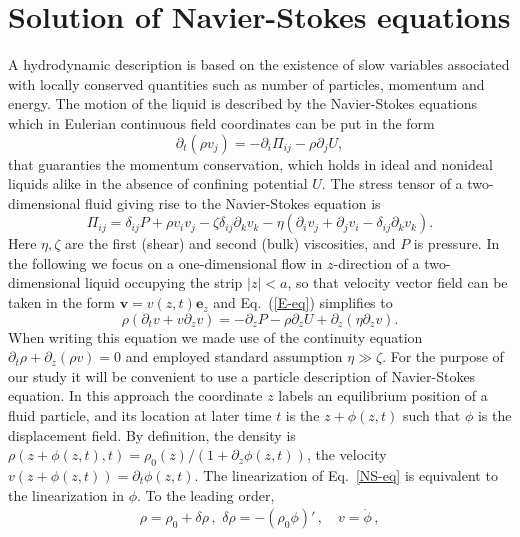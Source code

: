 \section{Solution of Navier-Stokes equations}
A hydrodynamic description is based on the existence of slow variables associated with locally conserved quantities such as number of particles, momentum and energy. The motion of the liquid is described by the Navier-Stokes equations which in Eulerian continuous field coordinates can be put in the form~\cite{LL} 
\begin{equation}\label{E-eq}
\partial_t(\rho v_j)=-\partial_i\Pi_{ij}-\rho\partial_jU,
\end{equation}
that guaranties the momentum conservation, which holds in ideal and nonideal liquids alike in the absence of confining potential $U$. The stress tensor of a two-dimensional fluid giving rise to the Navier-Stokes equation is~\cite{LL} 
\begin{equation}\label{Pi}
\Pi_{ij}=\delta_{ij}P+\rho v_iv_j-\zeta\delta_{ij}\partial_kv_k
-\eta(\partial_iv_j+\partial_jv_i-\delta_{ij}\partial_kv_k).
\end{equation}
Here $\eta,\zeta$ are the first (shear) and second (bulk) viscosities, and $P$ is pressure. In the following we focus on a one-dimensional flow in $z$-direction of a two-dimensional liquid occupying the strip $|z|<a$, so that velocity vector field can be taken in the form $\bm{v}=v(z,t)\bm{e}_z$ and Eq.~(\ref{E-eq}) simplifies to 
\begin{equation}\label{NS-eq}
\rho(\partial_t v+v\partial_zv)=-\partial_z P-\rho \partial_z U+\partial_z(\eta\partial_zv).
\end{equation}  
When writing this equation we made use of the continuity equation $\partial_t\rho+\partial_z(\rho v)=0$ and employed standard assumption $\eta\gg\zeta$. For the purpose of our study it will be convenient to use a particle description of Navier-Stokes equation.
In this approach the coordinate $z$ labels an equilibrium position of a fluid particle, and its location at later time $t$ is the $z+ \phi(z,t)$ such that $\phi$ is the displacement field.
By definition, the density is $\rho(z+\phi(z,t),t) = \rho_0(z)/ ( 1 + \partial_z \phi(z,t))$, the velocity $v(z+\phi(z,t)) = \partial_t \phi(z,t)$.
The linearization of Eq.~\eqref{NS-eq} is equivalent to the linearization in $\phi$.
To the leading order, 
\begin{align}\label{leading}
\rho = \rho_0 + \delta \rho\, ,\,\, \delta \rho  = 
- (\rho_0 \phi)'  \, , \quad  v = \dot{\phi} \, ,
\end{align}
